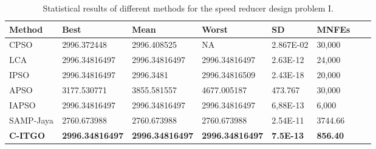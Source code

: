 
\begin{table*}[tp]
    \tiny
    \begin{center}
    
    \begin{tabular}{ P{2.0cm} P{2.0cm} P{2.0cm} P{2.0cm} P{2.0cm} P{2.0cm} P{2.0cm} P{2.0cm}  }
    \hline
    \textbf{Method} & \textbf{Best} & \textbf{Mean} & \textbf{Worst} & \textbf{SD} & \textbf{MNFEs} \\
    \hline
    
    CPSO & 2996.372448 & 2996.408525 & NA & 2.867E-02 & 30,000 \\
    LCA & 2996.34816497 & 2996.34816497 & 2996.34816497 & 2.63E-12 & 24,000 \\
    IPSO & 2996.34816497 & 2996.3481 & 2996.34816509 & 2.43E-18 & 20,000 \\
    APSO & 3177.530771 & 3855.581557 & 4677.005187 & 473.767 & 30,000 \\  
    IAPSO & 2996.34816497 & 2996.34816497 & 2996.34816497 & 6,88E-13 & 6,000 \\
    SAMP-Jaya & 2760.673988 & 2760.673988 & 2760.673988 & 2.54E-11 & 3744.66 \\    
    \textbf{C-ITGO} & \bf{2996.34816497} & \bf{2996.34816497} & \bf{2996.34816497} & \bf{7.5E-13} & \bf{856.40} \\
        
    \hline
    \end{tabular}
    \end{center}
    \vspace*{-6mm}
    \caption{Statistical results of different methods for the speed reducer design problem I. \\[1em]}
    \label{tab:SP1}
    \end{table*}
    
    